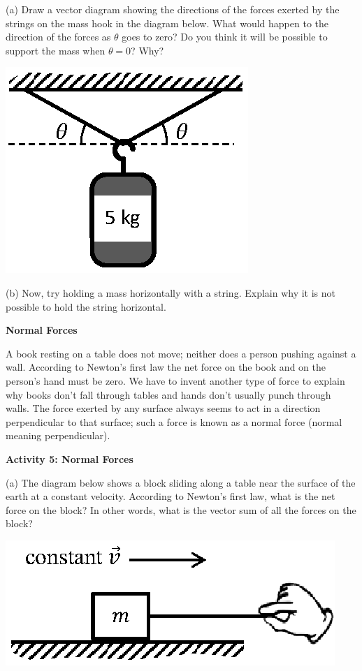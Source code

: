 (a) Draw a vector diagram showing the directions of the forces exerted by the
strings on the mass hook in the diagram below. What would happen to the direction
of the forces as \( \theta  \) goes to zero? Do you think it will be possible
to support the mass when $\theta  = 0$? Why?

\vspace{0.3cm}
\hspace{0.5in}\includegraphics[scale=1.2]{newton/newton_fig8_new.eps}
\vspace{0.3cm}

(b) Now, try holding a mass horizontally with a string. Explain why it is not possible to hold the string horizontal.
\answerspace{20mm}

\textbf{Normal Forces} 

A book resting on a table does not move; neither does a person pushing against
a wall. According to Newton's first law the net force on the book and on the
person's hand must be zero. We have to invent another type of force
to explain why books don't fall through tables and hands don't usually punch
through walls. The force exerted by any surface always seems to act in a direction perpendicular to that surface; such a force is known as a normal force (normal meaning perpendicular).

\textbf{Activity 5: Normal Forces }

(a) The diagram below shows a block sliding along a table near the surface of
the earth at a constant velocity. According to Newton's first law, what is the
net force on the block? In other words, what is the vector sum of all the forces on the block?

\vspace{0.3cm}
\hspace{0.5in}\includegraphics{newton/newton_fig9_new.eps}
\vspace{0.3cm}

